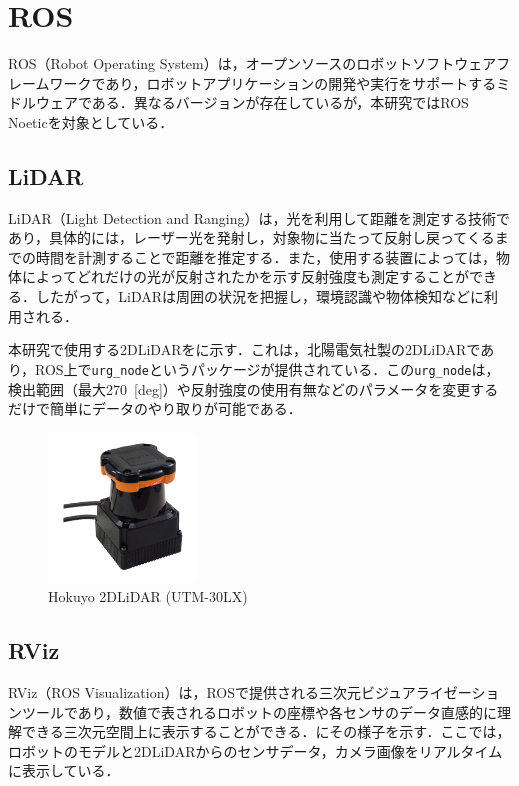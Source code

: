 
\section{ROS}

ROS（Robot Operating System）\cite{ros}は，オープンソースのロボットソフトウェアフレームワークであり，ロボットアプリケーションの開発や実行をサポートするミドルウェアである．異なるバージョンが存在しているが，本研究ではROS Noeticを対象としている．

\subsection{LiDAR}

  LiDAR（Light Detection and Ranging）は，光を利用して距離を測定する技術であり，具体的には，レーザー光を発射し，対象物に当たって反射し戻ってくるまでの時間を計測することで距離を推定する．また，使用する装置によっては，物体によってどれだけの光が反射されたかを示す反射強度も測定することができる．したがって，LiDARは周囲の状況を把握し，環境認識や物体検知などに利用される．

  本研究で使用する2DLiDARをに示す．これは，北陽電気社製の2DLiDARであり，ROS上で\texttt{urg\_node}\cite{urg_node}というパッケージが提供されている．この\texttt{urg\_node}は，検出範囲（最大270 \,[deg]）や反射強度の使用有無などのパラメータを変更するだけで簡単にデータのやり取りが可能である．

  \begin{figure}[h]
    \centering
    \includegraphics[keepaspectratio, scale=0.80] {images/RobotGuidance_hokuyo_lidar.png}
    \caption{Hokuyo 2DLiDAR (UTM-30LX) \cite{hokuyo}}
    \label{Fig:hokuyo_lidar}
  \end{figure}

\newpage

\subsection{RViz}

  RViz（ROS Visualization）\cite{rviz}は，ROSで提供される三次元ビジュアライゼーションツールであり，数値で表されるロボットの座標や各センサのデータ直感的に理解できる三次元空間上に表示することができる．にその様子を示す．ここでは，ロボットのモデルと2DLiDARからのセンサデータ，カメラ画像をリアルタイムに表示している．

